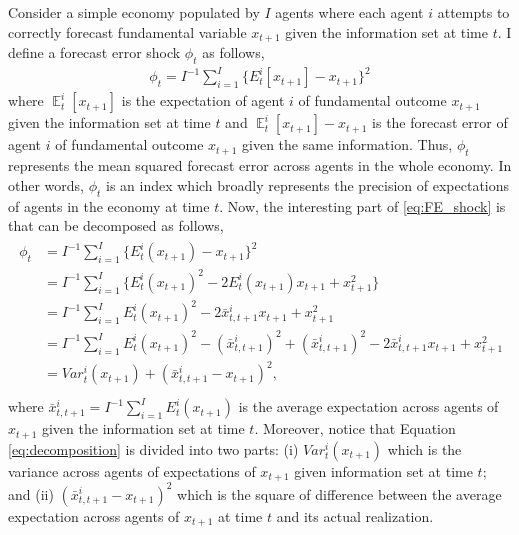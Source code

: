 \documentclass{article}
\DeclareMathOperator{\E}{\mathbb{E}}
\begin{document}
{Consider a simple economy populated by $I$ agents where each agent $i$ attempts to correctly forecast fundamental variable $x_{t+1}$ given the information set at time $t$. I define a forecast error shock $\phi_t$ as follows,
\begin{eqnarray}\label{eq:FE_shock}
\phi_t = I^{-1} \sum_{i=1}^I \big\{ E_t^i [ x_{t+1} ] - x_{t+1} \big\}^2 
\end{eqnarray}
where $\E^i_t [ x_{t+1} ]$ is the expectation of agent $i$ of fundamental outcome $x_{t+1}$ given the information set at time $t$ and $\E^i_t [ x_{t+1} ] - x_{t+1}$ is the forecast error of agent $i$ of fundamental outcome $x_{t+1}$ given the same information. Thus, $\phi_t$ represents the mean squared forecast error across agents in the whole economy. In other words, $\phi_t$ is an index which broadly represents the precision of expectations of agents in the economy at time $t$. Now, the interesting part of \ref{eq:FE_shock} is that can be decomposed as follows,
\begin{eqnarray}\label{eq:decomposition}
\begin{aligned}
\phi_t &= I^{-1} \sum_{i=1}^I \big\{ E_t^i ( x_{t+1} ) - x_{t+1} \big\}^2 \\
&= I^{-1} \sum_{i=1}^I \big\{  E_t^i ( x_{t+1} )^2 - 2E_t^i ( x_{t+1} )x_{t+1} + x_{t+1}^2  \big\} \\
&= I^{-1} \sum_{i=1}^I E_t^i ( x_{t+1} )^2 - 2\bar{x}_{t,t+1}^i x_{t+1} + x_{t+1}^2 \\
&= I^{-1} \sum_{i=1}^I E_t^i ( x_{t+1} )^2 - (\bar{x}_{t,t+1}^i)^2 + (\bar{x}_{t,t+1}^i)^2 - 2\bar{x}_{t,t+1}^i x_{t+1} + x_{t+1}^2 \\
&= Var^i_t(x_{t+1}) + (\bar{x}_{t,t+1}^i - x_{t+1})^2, \\
\end{aligned}
\end{eqnarray}
where $\bar{x}_{t,t+1}^i = I^{-1} \sum_{i=1}^I E_t^i ( x_{t+1} )$ is the average expectation across agents of $x_{t+1}$ given the information set at time $t$. Moreover, notice that Equation \ref{eq:decomposition} is divided into two parts: (i) $Var^i_t(x_{t+1})$ which is the variance across agents of expectations of $x_{t+1}$ given information set at time $t$; and (ii) $(\bar{x}_{t,t+1}^i - x_{t+1})^2$ which is the square of difference between the average expectation across agents of $x_{t+1}$ at time $t$ and its actual realization.

}
\end{document}
